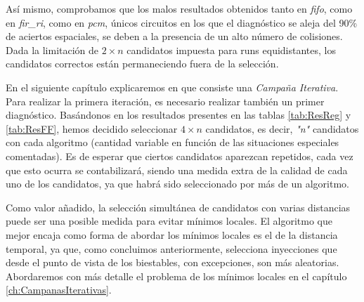 Así mismo, comprobamos que los malos resultados obtenidos tanto en \textit{fifo}, 
como en \textit{fir\_ri}, como en \textit{pcm}, únicos circuitos en los que el
diagnóstico se aleja del 90\% de aciertos espaciales, se deben a la presencia de
un alto número de colisiones. Dada la limitación de $2 \times n$ candidatos
impuesta para runs equidistantes, los candidatos correctos están permaneciendo
fuera de la selección.

En el siguiente capítulo explicaremos en que consiste una \textit{Campaña
Iterativa}. Para realizar la primera iteración, es necesario realizar también un
primer diagnóstico. Basándonos en  los resultados presentes en las tablas 
\ref{tab:ResReg} y \ref{tab:ResFF}, hemos decidido seleccionar $4 \times n$
candidatos, es decir, \textit{"n"} candidatos con cada algoritmo (cantidad
variable en función de las situaciones especiales comentadas). Es de esperar que
ciertos candidatos aparezcan repetidos, cada vez que esto ocurra se contabilizará,
siendo una medida extra de la calidad de cada uno de los candidatos, ya que habrá
sido seleccionado por más de un algoritmo.

Como valor añadido, la selección simultánea de candidatos con varias distancias
puede ser una posible medida para evitar mínimos locales. El algoritmo que mejor
encaja como forma de abordar los mínimos locales es el de la distancia temporal,
ya que, como concluimos anteriormente, selecciona inyecciones que desde el punto
de vista de los biestables, con excepciones, son más aleatorias. Abordaremos con 
más detalle el problema de los mínimos locales en el capítulo 
\ref{ch:CampanasIterativas}.



\endinput
